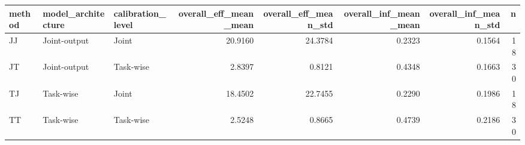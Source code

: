 \begin{tabular}{lllrrrrr}
\toprule
method & model_architecture & calibration_level & overall_eff_mean_mean & overall_eff_mean_std & overall_inf_mean_mean & overall_inf_mean_std & n \\
\midrule
JJ & Joint-output & Joint & 20.9160 & 24.3784 & 0.2323 & 0.1564 & 18 \\
JT & Joint-output & Task-wise & 2.8397 & 0.8121 & 0.4348 & 0.1663 & 30 \\
TJ & Task-wise & Joint & 18.4502 & 22.7455 & 0.2290 & 0.1986 & 18 \\
TT & Task-wise & Task-wise & 2.5248 & 0.8665 & 0.4739 & 0.2186 & 30 \\
\bottomrule
\end{tabular}
